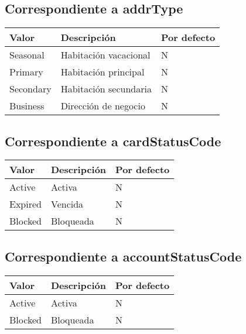 \subsection{Correspondiente a addrType}
\begin{center}
\begin{tabular}{|>{\centering\arraybackslash}p{}|>{\centering\arraybackslash}p{}|>{\centering\arraybackslash}p{}|}
\hline 
\bfseries {Valor} & \bfseries {Descripción} & \bfseries {Por defecto} \\ 
\hline 
Seasonal & Habitación vacacional & N \\ 
\hline 
Primary & Habitación principal & N \\
\hline 
Secondary & Habitación secundaria & N \\
\hline
Business & Dirección de negocio & N \\
\hline 
\end{tabular} 
\end{center}

\subsection{Correspondiente a cardStatusCode}
\begin{center}
\begin{tabular}{|>{\centering\arraybackslash}p{}|>{\centering\arraybackslash}p{}|>{\centering\arraybackslash}p{}|}
\hline 
\bfseries {Valor} & \bfseries {Descripción} & \bfseries {Por defecto} \\ 
\hline 
Active & Activa & N \\ 
\hline 
Expired & Vencida & N \\
\hline 
Blocked & Bloqueada & N \\
\hline
\end{tabular} 
\end{center}

\subsection{Correspondiente a accountStatusCode}
\begin{center}
\begin{tabular}{|>{\centering\arraybackslash}p{}|>{\centering\arraybackslash}p{}|>{\centering\arraybackslash}p{}|}
\hline 
\bfseries {Valor} & \bfseries {Descripción} & \bfseries {Por defecto} \\ 
\hline 
Active & Activa & N \\ 
\hline 
Blocked & Bloqueada & N \\
\hline
\end{tabular} 
\end{center}


